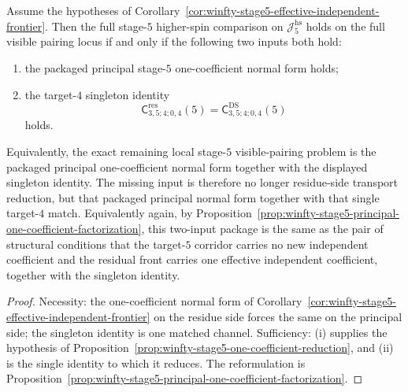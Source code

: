 \begin{corollary}
\label{cor:winfty-stage5-exact-remaining-input}
Assume the hypotheses of
Corollary~\ref{cor:winfty-stage5-effective-independent-frontier}. Then
the full stage-$5$ higher-spin comparison on \(\mathcal{J}_5^{\mathrm{hs}}\)
holds on the full visible pairing locus if and only if the following
two inputs both hold:
\begin{enumerate}[label=\textup{(\roman*)}]
\item the packaged principal stage-$5$ one-coefficient normal form
 holds;
\item the target-$4$ singleton identity
 \[
 \mathsf{C}^{\mathrm{res}}_{3,5;4;0,4}(5)
 =
 \mathsf{C}^{\mathrm{DS}}_{3,5;4;0,4}(5)
 \]
 holds.
\end{enumerate}
Equivalently, the exact remaining local stage-$5$ visible-pairing
problem is the packaged principal one-coefficient normal form together
with the displayed singleton identity. The missing input is therefore
no longer residue-side transport reduction, but that packaged
principal normal form together with that single target-$4$ match.
Equivalently again, by
Proposition~\ref{prop:winfty-stage5-principal-one-coefficient-factorization},
this two-input package is the same as the pair of structural
conditions that the target-$5$ corridor carries no new independent
coefficient and the residual front carries one effective independent
coefficient, together with the singleton identity.
\end{corollary}

\begin{proof}
Necessity: the one-coefficient normal form of Corollary~\ref{cor:winfty-stage5-effective-independent-frontier} on the residue side forces the same on the principal side; the singleton identity is one matched channel. Sufficiency: \textup{(i)} supplies the hypothesis of Proposition~\ref{prop:winfty-stage5-one-coefficient-reduction}, and \textup{(ii)} is the single identity to which it reduces. The reformulation is Proposition~\ref{prop:winfty-stage5-principal-one-coefficient-factorization}.
\end{proof}

